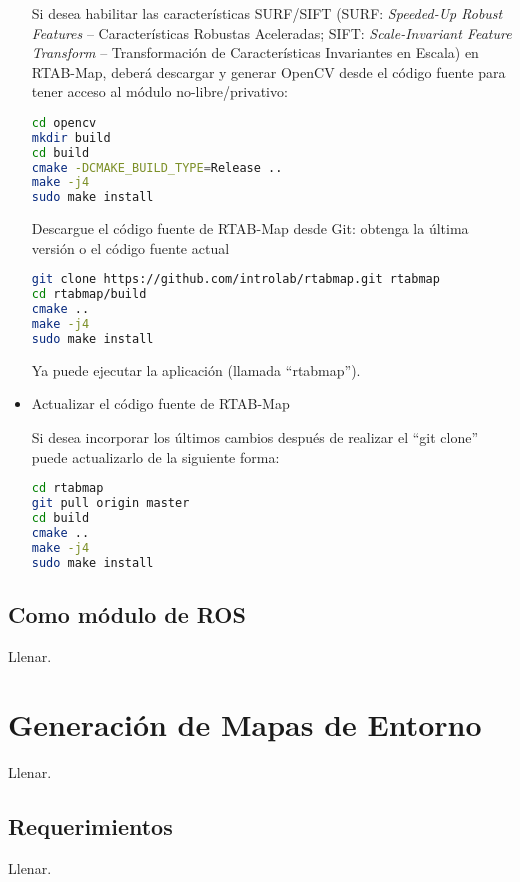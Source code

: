 \begin{itemize}
	Si desea habilitar las características SURF/SIFT (SURF: \textit{Speeded-Up Robust Features} -- Características Robustas Aceleradas; SIFT: \textit{Scale-Invariant Feature Transform} -- Transformación de Características Invariantes en Escala) en RTAB-Map, deberá descargar y generar OpenCV desde el código fuente para tener acceso al módulo no-libre/privativo:

	\begin{lstlisting}[language=bash]
cd opencv
mkdir build
cd build
cmake -DCMAKE_BUILD_TYPE=Release ..
make -j4
sudo make install
	\end{lstlisting}

	Descargue el código fuente de RTAB-Map desde Git: obtenga la última versión o el código fuente actual

	\begin{lstlisting}[language=bash]
git clone https://github.com/introlab/rtabmap.git rtabmap
cd rtabmap/build
cmake ..
make -j4
sudo make install
	\end{lstlisting}

	Ya puede ejecutar la aplicación (llamada ``rtabmap'').

	\item Actualizar el código fuente de RTAB-Map

	Si desea incorporar los últimos cambios después de realizar el ``git clone'' puede actualizarlo de la siguiente forma:

	\begin{lstlisting}[language=bash]
cd rtabmap
git pull origin master
cd build
cmake ..
make -j4
sudo make install
	\end{lstlisting}
\end{itemize}

\subsection{Como módulo de ROS}

Llenar.

\section{Generación de Mapas de Entorno}

Llenar.

\subsection{Requerimientos}

Llenar.

